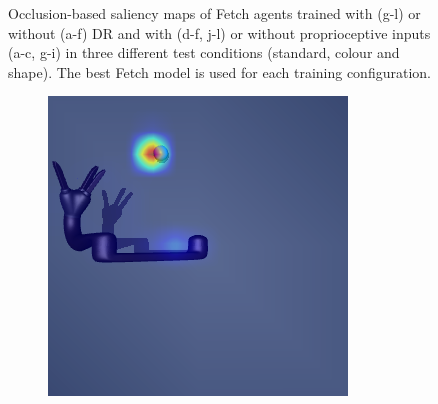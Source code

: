 \begin{figure}[h!]
\begin{subfigure}{0.24\columnwidth}
  \end{subfigure}
  \caption[Occlusion-based saliency maps of Fetch agents.]{Occlusion-based saliency maps of Fetch agents trained with (g-l) or without (a-f) DR and with (d-f, j-l) or without proprioceptive inputs (a-c, g-i) in three different test conditions (standard, colour and shape). The best Fetch model is used for each training configuration.}
  \label{fig:saliency_fetch_distractor}
\end{figure}

\begin{figure}[h!]
  \centering
  \begin{subfigure}{0.24\columnwidth}
    \includegraphics[width=\linewidth]{figures/chapter6/distractor_saliency_jaco_pro_off/standard_visual_std}
  \end{subfigure}
  \begin{subfigure}{0.24\columnwidth}

\end{subfigure}
\end{figure}
